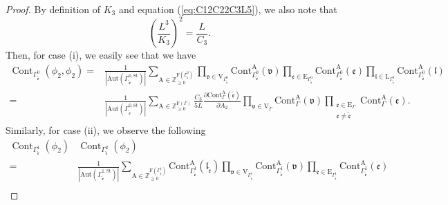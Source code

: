 \documentclass[12pt]{amsart}
\numberwithin{equation}{section}
\begin{document}
\begin{proof}
By definition of $K_3$ and equation (\ref{eq:C12C22C3L5}), we also note that 
\begin{equation*}
\left(\frac{L^{3}}{K_{3}}\right)^2=\frac{L}{C_{3}}.
\end{equation*}
Then, for case (i), we easily see that we have
\begin{equation}\label{eq:2_insertions_graph_cont}
\begin{aligned}
\operatorname{Cont}_{\Gamma_{\tilde{\mathfrak{e}}}^0}\left(\phi_2,\phi_2\right)
=&\frac{1}{|\mathrm{Aut}(\Gamma_{\tilde{\mathfrak{e}}}^{0,\mathrm{St}})|} \sum_{\mathrm{A} \in \mathbb{Z}_{\geq 0}^{\mathrm{F}({\Gamma_{\tilde{\mathfrak{e}}}^0})}} \prod_{\mathfrak{v} \in \mathrm{V}_{\Gamma_{\tilde{\mathfrak{e}}}^0}} \mathrm{Cont}_{\Gamma_{\tilde{\mathfrak{e}}}^0}^{\mathrm{A}}(\mathfrak{v}) \prod_{\mathfrak{e} \in \mathrm{E}_{\Gamma_{\tilde{\mathfrak{e}}}^0}} \mathrm{Cont}_{\Gamma_{\tilde{\mathfrak{e}}}^0}^{\mathrm{A}}(\mathfrak{e})\prod_{\mathfrak{l} \in \mathrm{L}_{\Gamma_{\tilde{\mathfrak{e}}}^0}} \mathrm{Cont}_{\Gamma_{\tilde{\mathfrak{e}}}^0}^{\mathrm{A}}(\mathfrak{l})\\
=&\frac{1}{|\mathrm{Aut}(\Gamma_{\tilde{\mathfrak{e}}}^{0,\mathrm{St}})|} \sum_{\mathrm{A} \in \mathbb{Z}_{\geq 0}^{\mathrm{F}(\Gamma)}}\frac{C_3}{5L}\frac{\partial \mathrm{Cont}_{\Gamma}^{\mathrm{A}}(\tilde{\mathfrak{e}}) }{\partial A_2} \prod_{\mathfrak{v} \in \mathrm{V}_{\Gamma}} \mathrm{Cont}_{\Gamma}^{\mathrm{A}}(\mathfrak{v}) \prod_{\substack{
\mathfrak{e} \in \mathrm{E}_{\Gamma} \\ \mathfrak{e}\neq \tilde{\mathfrak{e}}}} \mathrm{Cont}_{\Gamma}^{\mathrm{A}}(\mathfrak{e}).
\end{aligned}
\end{equation}
Similarly, for case (ii), we observe the following
\begin{equation}\label{eq:prod_of_1_insertions_graph_conts}
\begin{aligned}
\operatorname{Cont}_{\Gamma_{\tilde{\mathfrak{e}}}^1}\left(\phi_{2}\right)&\operatorname{Cont}_{\Gamma_{\tilde{\mathfrak{e}}}^2}\left(\phi_{2}\right)\\
=&\frac{1}{|\mathrm{Aut}(\Gamma_{\tilde{\mathfrak{e}}}^{1,\mathrm{St}})|} \sum_{\mathrm{A} \in \mathbb{Z}_{\geq 0}^{\mathrm{F}({\Gamma_{\tilde{\mathfrak{e}}}^1})}} \mathrm{Cont}_{\Gamma_{\tilde{\mathfrak{e}}}^1}^{\mathrm{A}}(\mathfrak{l}_{\tilde{\mathfrak{e}}})\prod_{\mathfrak{v} \in \mathrm{V}_{\Gamma_{\tilde{\mathfrak{e}}}^1}} \mathrm{Cont}_{\Gamma_{\tilde{\mathfrak{e}}}^1}^{\mathrm{A}}(\mathfrak{v}) \prod_{\mathfrak{e} \in \mathrm{E}_{\Gamma_{\tilde{\mathfrak{e}}}^1}} \mathrm{Cont}_{\Gamma_{\tilde{\mathfrak{e}}}^1}^{\mathrm{A}}(\mathfrak{e})\\

\end{aligned}
\end{equation}
\end{proof}
\end{document}
